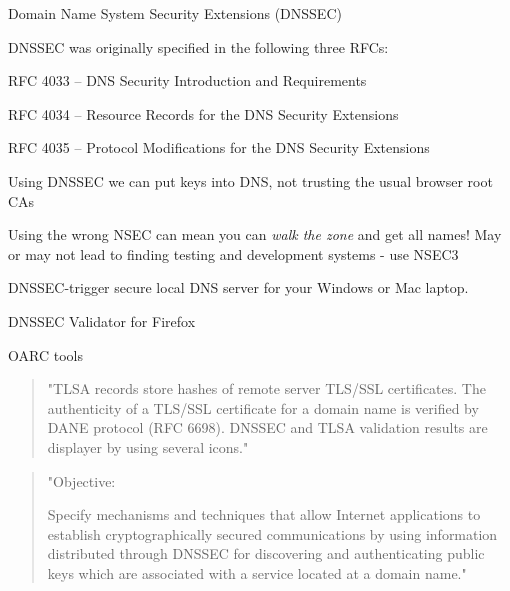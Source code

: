 \documentclass[Screen16to9,17pt]{foils}
\begin{document}
\begin{list1}
\item Domain Name System Security Extensions (DNSSEC)
\item DNSSEC was originally specified in the following three RFCs:
\item RFC 4033 – DNS Security Introduction and Requirements
\item RFC 4034 – Resource Records for the DNS Security Extensions
\item RFC 4035 – Protocol Modifications for the DNS Security Extensions\\
\item Using DNSSEC we can put keys into DNS, not trusting the usual browser root CAs
\item Using the wrong NSEC can mean you can \emph{walk the zone} and get all names! May or may not lead to finding testing and development systems - use NSEC3
\end{list1}




DNSSEC-trigger secure local DNS server for your Windows or Mac laptop.

\begin{list2}
\item DNSSEC Validator for Firefox\\ 
\item OARC tools 
\item {}
\end{list2}



\begin{quote}
"TLSA records store hashes of remote server TLS/SSL certificates. The authenticity of a TLS/SSL certificate for a domain name is verified by DANE protocol (RFC 6698). DNSSEC and TLSA validation results are displayer by using several icons."
\end{quote}



\begin{quote}
"Objective:

Specify mechanisms and techniques that allow Internet applications to
establish cryptographically secured communications by using information
distributed through DNSSEC for discovering and authenticating public
keys which are associated with a service located at a domain name."
\end{quote}
\end{document}
